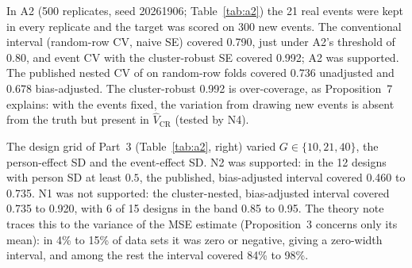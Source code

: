 \documentclass[11pt]{amsart}
\theoremstyle{plain}
\theoremstyle{definition}
\theoremstyle{remark}
\newcommand{\VCR}{\hat V_{\mathrm{CR}}}
\begin{document}
In A2 (500 replicates, seed 20261906; Table~\ref{tab:a2}) the 21 real events were kept in every replicate and the target was scored on 300 new events. The conventional interval (random-row CV, naive SE) covered 0.790, just under A2's threshold of $0.80$, and event CV with the cluster-robust SE covered 0.992; A2 was supported. The published nested CV of \cite{BHT} on random-row folds covered 0.736 unadjusted and 0.678 bias-adjusted. The cluster-robust 0.992 is over-coverage, as Proposition~7 explains: with the events fixed, the variation from drawing new events is absent from the truth but present in $\VCR$ (tested by N4).

The design grid of Part~3 (Table~\ref{tab:a2}, right) varied $G\in\{10,21,40\}$, the person-effect SD and the event-effect SD. N2 was supported: in the 12 designs with person SD at least $0.5$, the published, bias-adjusted interval covered 0.460 to 0.735. N1 was not supported: the cluster-nested, bias-adjusted interval covered 0.735 to 0.920, with 6 of 15 designs in the band 0.85 to 0.95. The theory note traces this to the variance of the MSE estimate (Proposition~3 concerns only its mean): in 4\% to 15\% of data sets it was zero or negative, giving a zero-width interval, and among the rest the interval covered 84\% to 98\%.
\end{document}

